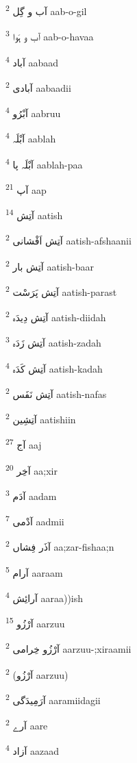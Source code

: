 \documentclass[12pt]{article}
\begin{document}
\begin{RTL}
\begin{multicols}{5}
{\ur آب و گِل}   \textsuperscript{2} aab-o-gil

{\ur آب و ہَوا}   \textsuperscript{3} aab-o-havaa

{\ur آباد}   \textsuperscript{4} aabaad

{\ur آبادی}   \textsuperscript{2} aabaadii

{\ur آبْرُو}   \textsuperscript{4} aabruu

{\ur آبْلَہ}   \textsuperscript{4} aablah

{\ur آبْلَہ پا}   \textsuperscript{4} aablah-paa

{\ur آپ}   \textsuperscript{21} aap

{\ur آتِش}   \textsuperscript{14} aatish

{\ur آتِش اَفْشانی}   \textsuperscript{2} aatish-afshaanii

{\ur آتِش بار}   \textsuperscript{2} aatish-baar

{\ur آتِش پَرَسْت}   \textsuperscript{2} aatish-parast

{\ur آتِش دِیدَہ}   \textsuperscript{2} aatish-diidah

{\ur آتِش زَدَہ}   \textsuperscript{3} aatish-zadah

{\ur آتِش کَدَہ}   \textsuperscript{4} aatish-kadah

{\ur آتِش نَفَس}   \textsuperscript{2} aatish-nafas

{\ur آتِشِین}   \textsuperscript{2} aatishiin

{\ur آج}   \textsuperscript{27} aaj

{\ur آخِر}   \textsuperscript{20} aa;xir

{\ur آدَم}   \textsuperscript{3} aadam

{\ur آدْمی}   \textsuperscript{7} aadmii

{\ur آذَر فِشاں}   \textsuperscript{2} aa;zar-fishaa;n

{\ur آرام}   \textsuperscript{5} aaraam

{\ur آرائِش}   \textsuperscript{4} aaraa))ish

{\ur آرْزُو}   \textsuperscript{15} aarzuu

{\ur آرْزُو خِرامی}   \textsuperscript{2} aarzuu-;xiraamii

{\ur آرْزُو)}   \textsuperscript{2} aarzuu)

{\ur آرَمِیدَگی}   \textsuperscript{2} aaramiidagii

{\ur آرے}   \textsuperscript{2} aare

{\ur آزاد}   \textsuperscript{4} aazaad


\end{multicols}
\end{RTL}
\end{document}
